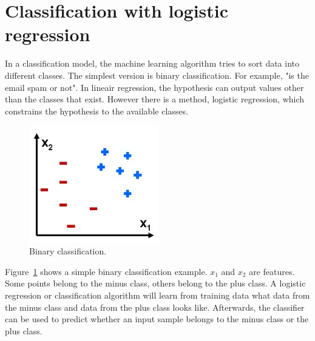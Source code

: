 \section{Classification with logistic regression}
\label{classification}
In a classification model, the machine learning algorithm tries to sort data into different classes. The simplest version is binary classification. For example, "is the email spam or not". In lineair regression, the hypothesis can output values other than the classes that exist. However there is a method, logistic regression, which constrains the hypothesis to the available classes.

\begin{figure}[H]
\centering
\includegraphics[width=0.5\textwidth]{Figures/binclass}
\decoRule
\caption[Binary classification]{Binary classification. \cite{binclass}}
\label{fig:binclass}
\end{figure}
\noindent Figure~\ref{fig:binclass} shows a simple binary classification example. $x_1$ and $x_2$ are features. Some points belong to the minus class, others belong to the plus class. A logistic regression or classification algorithm will learn from training data what data from the minus class and data from the plus class looks like. Afterwards, the classifier can be used to predict whether an input sample belongs to the minus class or the plus class.

